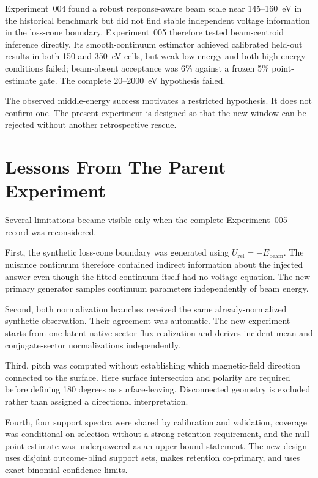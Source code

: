 \documentclass[11pt]{article}
\newcommand{\Urel}{U_{\mathrm{rel}}}
\newcommand{\Ebeam}{E_{\mathrm{beam}}}
\begin{document}
Experiment~004 found a robust response-aware beam scale near 145--160~eV in the
historical benchmark but did not find stable independent voltage information
in the loss-cone boundary.  Experiment~005 therefore tested beam-centroid
inference directly.  Its smooth-continuum estimator achieved calibrated
held-out results in both 150 and 350~eV cells, but weak low-energy and both
high-energy conditions failed; beam-absent acceptance was 6\% against a frozen
5\% point-estimate gate.  The complete 20--2000~eV hypothesis failed.

The observed middle-energy success motivates a restricted hypothesis.  It does
not confirm one.  The present experiment is designed so that the new window can
be rejected without another retrospective rescue.

\section{Lessons From The Parent Experiment}

Several limitations became visible only when the complete Experiment~005 record
was reconsidered.

First, the synthetic loss-cone boundary was generated using
$\Urel=-\Ebeam$.  The nuisance continuum therefore contained indirect
information about the injected answer even though the fitted continuum itself
had no voltage equation.  The new primary generator samples continuum
parameters independently of beam energy.

Second, both normalization branches received the same already-normalized
synthetic observation.  Their agreement was automatic.  The new experiment
starts from one latent native-sector flux realization and derives incident-mean
and conjugate-sector normalizations independently.

Third, pitch was computed without establishing which magnetic-field direction
connected to the surface.  Here surface intersection and polarity are required
before defining 180 degrees as surface-leaving.  Disconnected geometry is
excluded rather than assigned a directional interpretation.

Fourth, four support spectra were shared by calibration and validation,
coverage was conditional on selection without a strong retention requirement,
and the null point estimate was underpowered as an upper-bound statement.  The
new design uses disjoint outcome-blind support sets, makes retention co-primary,
and uses exact binomial confidence limits.
\end{document}
